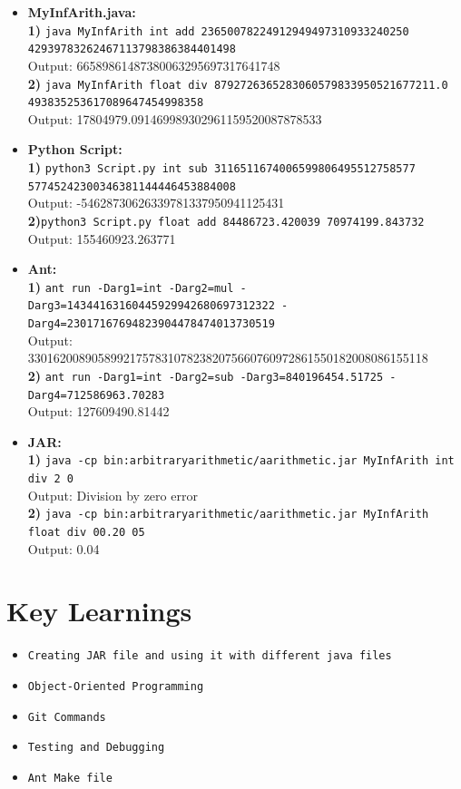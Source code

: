 \documentclass{article}
\begin{document}
\begin{itemize}
    \item \textbf{MyInfArith.java:}\\
    \textbf{1)} \texttt{java MyInfArith int add 23650078224912949497310933240250}\\
    \texttt{42939783262467113798386384401498}\\
    Output: 66589861487380063295697317641748\\
    \textbf{2)} \texttt{java MyInfArith float div 8792726365283060579833950521677211.0
493835253617089647454998358}\\
    Output: 17804979.091469989302961159520087878533
    
    \item \textbf{Python Script:}\\
    \textbf{1)} \texttt{python3 Script.py int sub 3116511674006599806495512758577}\\
    \texttt{57745242300346381144446453884008}\\
    Output: -54628730626339781337950941125431\\
    \textbf{2)}\texttt{python3 Script.py float add 84486723.420039 70974199.843732}\\
    Output: 155460923.263771
    
    \item \textbf{Ant:}\\
    \textbf{1)} \texttt{ant run -Darg1=int -Darg2=mul -Darg3=14344163160445929942680697312322 -Darg4=23017167694823904478474013730519}\\
    Output: 330162008905899217578310782382075660760972861550182008086155118\\
    \textbf{2)} \texttt{ant run -Darg1=int -Darg2=sub -Darg3=840196454.51725 -Darg4=712586963.70283}\\
    Output: 127609490.81442

    \item \textbf{JAR:}\\
    \textbf{1)} \texttt{java -cp bin:arbitraryarithmetic/aarithmetic.jar MyInfArith int div 2 0}\\
    Output: Division by zero error\\
    \textbf{2)} \texttt{java -cp bin:arbitraryarithmetic/aarithmetic.jar MyInfArith float div 00.20 05}\\
    Output: 0.04
\end{itemize}


\section{Key Learnings}
\begin{itemize}
    \item \texttt{Creating JAR file and using it with different java files}
    \item \texttt{Object-Oriented Programming} 
    \item \texttt{Git Commands}
    \item \texttt{Testing and Debugging}
    \item \texttt{Ant Make file}    
\end{itemize}
\end{document}
